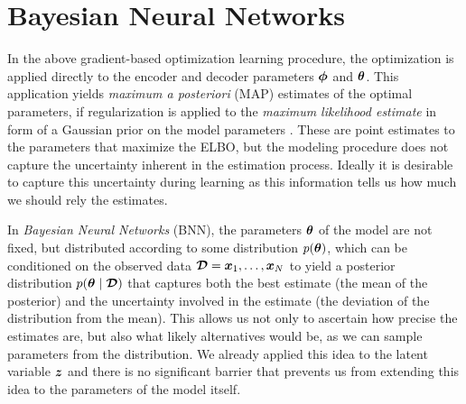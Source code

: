 \section{Bayesian Neural Networks}
\label{sec:bayesian_neural_networks}
In the above gradient-based optimization learning procedure, the optimization is applied directly to the encoder and decoder parameters $\bm{ \phi }$ and $\bm{ \theta }$. This application yields \textit{maximum a posteriori} (MAP) estimates of the optimal parameters, if regularization is applied to the \textit{maximum likelihood estimate} in form of a Gaussian prior on the model parameters \cite{blundell2015weight}. These are point estimates to the parameters that maximize the ELBO, but the modeling procedure does not capture the uncertainty inherent in the estimation process. Ideally it is desirable to capture this uncertainty during learning as this information tells us how much we should rely the estimates.

In \textit{Bayesian Neural Networks} (BNN), the parameters $\bm{ \theta }$ of the model are not fixed, but distributed according to some distribution $p(\bm{ \theta })$, which can be conditioned on the observed data $\bm{ \mathcal{D} } = \bm{ x }_1, \ldots, \bm{ x }_N$ to yield a posterior distribution $p(\bm{ \theta } \mid \bm{ \mathcal{D} })$ that captures both the best estimate (the mean of the posterior) and the uncertainty involved in the estimate (the deviation of the distribution from the mean). This allows us not only to ascertain how precise the estimates are, but also what likely alternatives would be, as we can sample parameters from the distribution. We already applied this idea to the latent variable $\bm{ z }$ and there is no significant barrier that prevents us from extending this idea to the parameters of the model itself.

